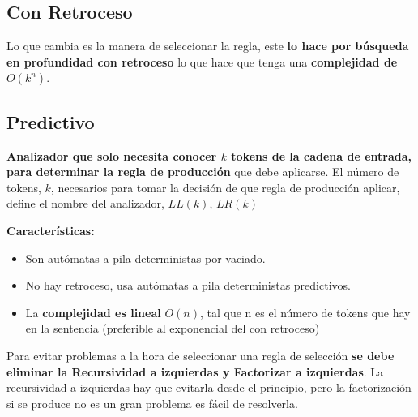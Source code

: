 \documentclass[12pt, twoside, openright]{report} %
\begin{document}
\subsection{Con Retroceso}

Lo que cambia es la manera de seleccionar la regla, este \textbf{lo hace
por búsqueda en profundidad con retroceso} lo que hace que tenga una
\textbf{complejidad de \(O(k^n)\)}.


\subsection{Predictivo}

\textbf{Analizador que solo necesita conocer \(k\) tokens de la cadena
de entrada, para determinar la regla de producción} que debe aplicarse.
El número de tokens, \(k\), necesarios para tomar la decisión de que
regla de producción aplicar, define el nombre del analizador, \(LL(k)\),
\(LR(k)\)

\textbf{Características:}

\begin{itemize}

\item
  Son autómatas a pila deterministas por vaciado.
\item
  No hay retroceso, usa autómatas a pila deterministas predictivos.
\item
  La \textbf{complejidad es lineal} \(O(n)\), tal que n es el número de
  tokens que hay en la sentencia (preferible al exponencial del con
  retroceso)
\end{itemize}

Para evitar problemas a la hora de seleccionar una regla de selección
\textbf{se debe eliminar la Recursividad a izquierdas y Factorizar a
izquierdas}. La recursividad a izquierdas hay que evitarla desde el
principio, pero la factorización si se produce no es un gran problema es
fácil de resolverla.
\end{document}
